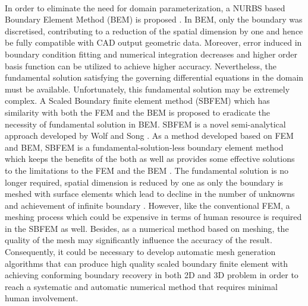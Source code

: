 \paragraph{}
In order to eliminate the need for domain parameterization, a NURBS based Boundary Element Method (BEM) is proposed \citep{Li2011,Taka2012,Beli2013,Sco2013,Sim2013}.
In BEM, only the boundary was discretised, contributing to a reduction of the spatial dimension by one and hence be fully compatible with CAD output geometric data. Moreover, error induced in boundary condition fitting and numerical integration decreases and higher order basis function can be utilized to achieve higher accuracy. Nevertheless, the fundamental solution satisfying the governing differential equations in the domain must be available.
Unfortunately, this fundamental solution may be extremely complex.
A Scaled Boundary finite element method (SBFEM) which has similarity with both the FEM and the BEM is proposed to eradicate the necessity of fundamental solution in BEM.
SBFEM is a novel semi-analytical approach developed by Wolf and Song \citep{Wol1999}.
As a method developed based on FEM and BEM, SBFEM is a fundamental-solution-less boundary element method which keeps the benefits of the both as well as provides some effective solutions to the limitations to the FEM and the BEM \citep{Wol1999}.
The fundamental solution is no longer required, spatial dimension is reduced by one as only the boundary is meshed with surface elements which lead to decline in the number of unknowns and achievement of infinite boundary \citep{Wol2003}.
However, like the conventional FEM, a meshing process which could be expensive in terms of human resource is required in the SBFEM as well.
Besides, as a numerical method based on meshing, the quality of the mesh may significantly influence the accuracy of the result.
Consequently, it could be necessary to develop automatic mesh generation algorithms that can produce high quality scaled boundary finite element with achieving conforming boundary recovery in both 2D and 3D problem in order to reach a systematic and automatic numerical method that requires minimal human involvement.

